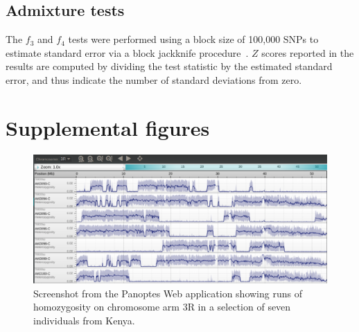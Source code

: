 \begin{refsection}
\subsection{Admixture tests}\label{subsec:methods-admixture}


The $f_3$ and $f_4$ tests were performed using a block size of 100,000 SNPs to estimate standard error via a block jackknife procedure~\parencite{Patterson2012}.
%
$Z$ scores reported in the results are computed by dividing the test statistic by the estimated standard error, and thus indicate the number of standard deviations from zero.


\clearpage
\section{Supplemental figures}\label{sec:ch4-supplemental-figures}


\begin{figure}[h!]
\centering
\includegraphics[width=1.1\textwidth,center]{artwork/chapter4/keroh.pdf}
\caption{Screenshot from the Panoptes Web application showing runs of homozygosity on chromosome arm 3R in a selection of seven individuals from Kenya.
%
}
\label{fig:keroh}
\end{figure}



\end{refsection}

